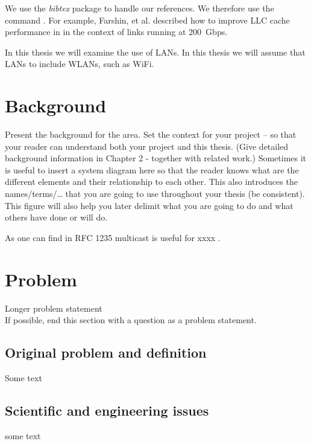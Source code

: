 We use the \emph{bibtex} package to handle our references.  We therefore
use the command \cite{farshin_make_2019}. For example, Farshin, et al. described how to improve LLC
cache performance in \cite{farshin_make_2019} in the context of links running
at \SI{200}{Gbps}.

In this thesis we will examine the use of \glspl{LAN}. In this thesis we will
assume that \glspl{LAN} to include \glspl{WLAN}, such as \gls{WiFi}.

\section{Background}
\label{sec:background}
Present the background for the area. Set the context for your project – so that your reader can understand both your project and this thesis. (Give detailed background information in Chapter 2 - together with related work.)
Sometimes it is useful to insert a system diagram here so that the reader
knows what are the different elements and their relationship to each
other. This also introduces the names/terms/… that you are going to use
throughout your thesis (be consistent). This figure will also help you later
delimit what you are going to do and what others have done or will do.

As one can find in RFC 1235\cite{ioannidis_coherent_1991} multicast is useful for xxxx .

\section{Problem}

Longer problem statement\\
If possible, end this section with a question as a problem statement.

\subsection{Original problem and definition}
Some text

\subsection{Scientific and engineering issues}
some text

